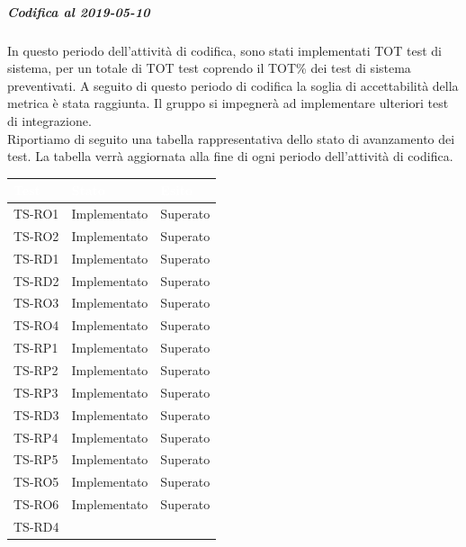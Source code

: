 \subparagraph{Codifica al 2019-05-10}
In questo periodo dell'attività di codifica, sono stati implementati TOT test di sistema, per un totale di TOT test coprendo il TOT\% dei test di sistema preventivati.
A seguito di questo periodo di codifica la soglia di accettabilità della metrica è stata raggiunta.
Il gruppo si impegnerà ad implementare ulteriori test di integrazione.\\
Riportiamo di seguito una tabella rappresentativa dello stato di avanzamento dei test. La tabella verrà aggiornata alla fine di ogni periodo dell'attività di codifica.


\begin{longtable}{|>{\centering\arraybackslash}m{1.6cm}|>{\centering\arraybackslash}m{6.41cm}|>{\centering\arraybackslash}m{3.1cm}|}		
	\rowcolor{LightBlue}
	\textbf{\textcolor{white}{Test}}
	& \textbf{\textcolor{white}{Stato}}
	& \textbf{\textcolor{white}{Esito}}\\
	\hline
		\rowcolor{LightGray}
		TS-RO1
		& Implementato
		& Superato
		\\ \hline
		\rowcolor{white}
		TS-RO2
		& Implementato
		& Superato
		\\ \hline
		\rowcolor{LightGray}
		TS-RD1
		& Implementato
		& Superato
		\\ \hline
		\rowcolor{white}
		TS-RD2
		& Implementato
		& Superato 
		\\ \hline
		\rowcolor{LightGray}
		TS-RO3
		& Implementato
		& Superato
		\\ \hline
		\rowcolor{white}
		TS-RO4		
		& Implementato
		& Superato
		\\ \hline
		\rowcolor{LightGray}
		TS-RP1		
		& Implementato
		& Superato	
		\\ \hline
		\rowcolor{LightGray}
		TS-RP2		
		& Implementato
		& Superato
		\\ \hline
		\rowcolor{white}
		TS-RP3		
		& Implementato
		& Superato
		\\ \hline
		\rowcolor{LightGray}
		TS-RD3		
		& Implementato
		& Superato
		\\ \hline
		\rowcolor{white}
		TS-RP4		
		& Implementato
		& Superato
		\\ \hline
		\rowcolor{LightGray}
		TS-RP5		
		& Implementato
		& Superato
		\\ \hline
		\rowcolor{white}
		TS-RO5		
		& Implementato
		& Superato
		\\ \hline
		\rowcolor{LightGray}
		TS-RO6		
		& Implementato
		& Superato
		\\ \hline
		\rowcolor{white}
		TS-RD4		

\end{longtable}
